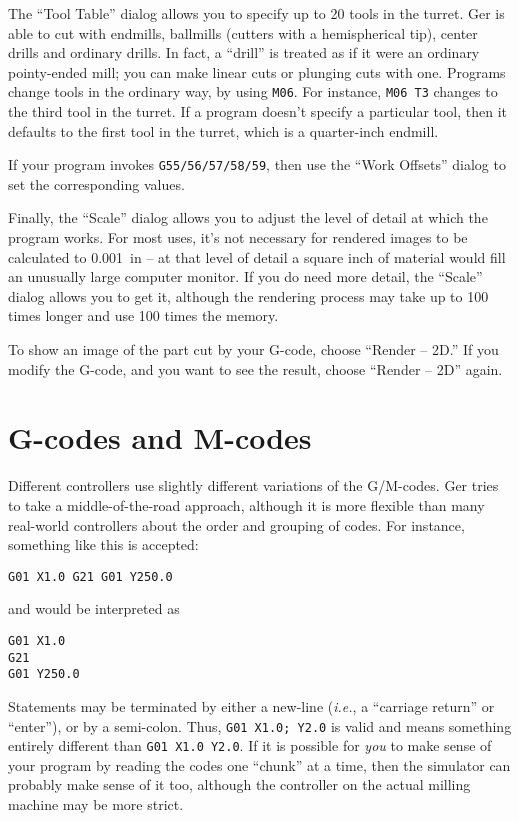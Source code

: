 \documentclass[titlepage,oneside,10pt]{article}
\begin{document}
The ``Tool Table'' dialog allows you to specify up to 20 tools in the
turret. Ger is able to cut with endmills, ballmills (cutters with a
hemispherical tip), center drills and ordinary drills. In fact, a
``drill'' is treated as if it were an ordinary pointy-ended mill; you
can make linear cuts or plunging cuts with one. Programs change tools
in the ordinary way, by using {\tt M06}. For instance, {\tt M06 T3}
changes to the third tool in the turret. If a program doesn't specify
a particular tool, then it defaults to the first tool in the turret,
which is a quarter-inch endmill.

If your program invokes {\tt G55/56/57/58/59}, then use the ``Work
Offsets'' dialog to set the corresponding values.

Finally, the ``Scale'' dialog allows you to adjust the level of detail
at which the program works. For most uses, it's not necessary for
rendered images to be calculated to 0.001~in -- at that level of
detail a square inch of material would fill an unusually large
computer monitor. If you do need more detail, the ``Scale'' dialog
allows you to get it, although the rendering process may take up to
100 times longer and use 100 times the memory.

To show an image of the part cut by your G-code, choose ``Render --
2D.'' If you modify the G-code, and you want to see the result,
choose ``Render -- 2D'' again.

\section{G-codes and M-codes}

Different controllers use slightly different variations of the
G/M-codes. Ger tries to take a middle-of-the-road approach, although
it is more flexible than many real-world controllers about the order
and grouping of codes. For instance, something like this is accepted:
\begin{verbatim}
G01 X1.0 G21 G01 Y250.0
\end{verbatim}
and would be interpreted as
\begin{verbatim}
G01 X1.0 
G21 
G01 Y250.0
\end{verbatim}
Statements may be terminated by either a new-line (\emph{i.e.}, a
``carriage return'' or ``enter''), or by a semi-colon. Thus, {\tt G01
  X1.0; Y2.0} is valid and 
means something entirely different than {\tt G01 X1.0 Y2.0}.  If it is
possible for \emph{you} to make sense of your program by 
reading the codes one ``chunk'' at a time, then the simulator can
probably make sense of it too, although the controller on the actual
milling machine may be more strict. 
\end{document}
